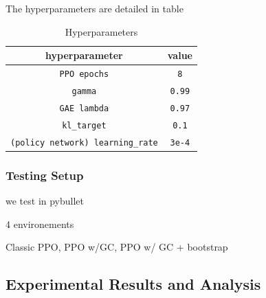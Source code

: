 The hyperparameters are detailed in table %

\begin{table}
  \begin{center}
    \begin{tabular}{cc}
      \hline 
      hyperparameter & value \\ 
      \hline 
      \verb!PPO epochs! &  \verb!8! \\
      \verb!gamma! & \verb!0.99! \\
      \verb!GAE lambda! & \verb!0.97! \\
      \verb!kl_target! & \verb!0.1! \\
      \verb!(policy network) learning_rate! & \verb!3e-4! \\
      \hline      
    \end{tabular}
  \end{center}
  \caption{Hyperparameters}
  \label{hyperparameters}
\end{table}



\subsubsection{Testing Setup}



we test in pybullet

4 environements

Classic PPO, PPO w/GC, PPO w/ GC + bootstrap

\subsection{Experimental Results and Analysis}


